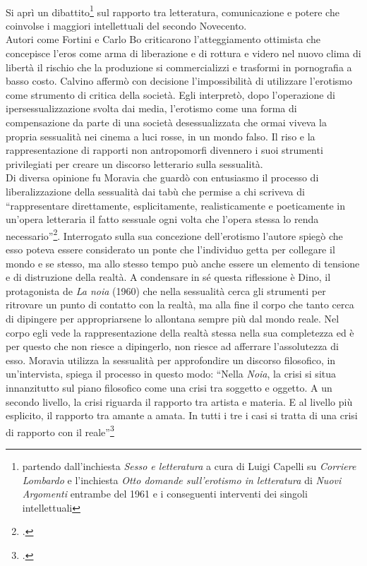 \paragraph{} Si aprì un dibattito\footnote{partendo dall'inchiesta  \textit{Sesso e letteratura} a cura di Luigi Capelli su \textit{Corriere Lombardo} e l'inchiesta \textit{Otto domande sull'erotismo in letteratura} di \textit{Nuovi Argomenti} entrambe del 1961 
e i conseguenti interventi dei singoli intellettuali} sul rapporto tra letteratura, comunicazione e potere che coinvolse i maggiori intellettuali del secondo Novecento.
\\Autori come Fortini e Carlo Bo criticarono l'atteggiamento ottimista che concepisce l'eros come arma di liberazione e di rottura e videro nel nuovo clima di libertà il rischio che la produzione si commercializzi e trasformi in pornografia a basso costo.
Calvino affermò con decisione l'impossibilità di utilizzare l'erotismo come strumento di critica della società.
Egli interpretò, dopo l'operazione di ipersessualizzazione svolta dai media, l'erotismo come una forma di compensazione da parte di una società desessualizzata che ormai viveva la propria sessualità nei cinema a luci rosse, in un mondo falso.
Il riso e la rappresentazione di rapporti non antropomorfi divennero i suoi strumenti privilegiati per creare un discorso letterario sulla sessualità. 
\\Di diversa opinione fu Moravia che guardò con entusiasmo il processo di liberalizzazione della sessualità dai tabù che permise a chi scriveva di \enquote{rappresentare direttamente, esplicitamente, realisticamente e poeticamente in un'opera letteraria il fatto sessuale ogni volta che l'opera stessa lo renda necessario}\footcite{Moravia}.
Interrogato sulla sua concezione dell'erotismo l'autore spiegò che esso poteva essere considerato un ponte che l'individuo getta per collegare il mondo e se stesso, ma allo stesso tempo può anche essere un elemento di tensione e di distruzione della realtà.
A condensare in sé questa riflessione è Dino, il protagonista de \textit{La noia} (1960) che nella sessualità cerca gli strumenti per ritrovare un punto di contatto con la realtà, ma alla fine il corpo che tanto cerca di dipingere per appropriarsene lo allontana sempre più dal mondo reale.
Nel corpo egli vede la rappresentazione della realtà stessa nella sua completezza ed è per questo che non riesce a dipingerlo, non riesce ad afferrare l'assolutezza di esso.
Moravia utilizza la sessualità per approfondire un discorso filosofico, in un'intervista, spiega il processo in questo modo: \enquote{Nella \textit{Noia}, la crisi si situa innanzitutto sul piano filosofico come una crisi tra soggetto e oggetto. A un secondo livello, la crisi riguarda il rapporto tra artista e materia. E al livello più esplicito, il rapporto tra amante a amata. In tutti i tre i casi si tratta di una crisi di rapporto con il reale}\footcite{Moravia2}

